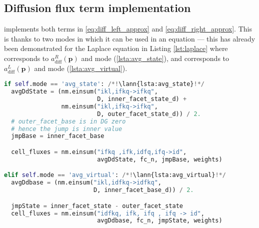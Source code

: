\subsection{Diffusion flux term implementation}
\label{se:diff_flux_term_imp}
 implements both terms in
\eqref{eq:diff_left_approx} and \eqref{eq:diff_right_approx}. This is thanks to two modes
in which it can be used in an equation --- this has already been demonstrated for the Laplace
equation in Listing \ref{lst:laplace} where  corresponds to $a^R_\mathrm{diff}(\mathbf{p})$ and mode 
(\ref{lsta:avg_state}), and 
corresponds to $a^L_\mathrm{diff}(\mathbf{p})$ and mode 
(\ref{lsta:avg_virtual}).
\setcounter{lstannotation}{0}
\begin{lstlisting}[language=Python, caption=Computation of diffusion cell
fluxes]
if self.mode == 'avg_state': /*!\lann{lsta:avg_state}!*/
  avgDdState = (nm.einsum("ikl,ifkq->ifkq",
                          D, inner_facet_state_d) +
                nm.einsum("ikl,ifkq->ifkq",
                          D, outer_facet_state_d)) / 2.
  # outer_facet_base is in DG zero
  # hence the jump is inner value
  jmpBase = inner_facet_base

  cell_fluxes = nm.einsum("ifkq ,ifk,idfq,ifq->id",
                          avgDdState, fc_n, jmpBase, weights)

elif self.mode == 'avg_virtual': /*!\lann{lsta:avg_virtual}!*/
  avgDdbase = (nm.einsum("ikl,idfkq->idfkq",
                         D, inner_facet_base_d)) / 2.

  jmpState = inner_facet_state - outer_facet_state
  cell_fluxes = nm.einsum("idfkq, ifk, ifq , ifq -> id",
                          avgDdbase, fc_n, jmpState, weights)
\end{lstlisting}


